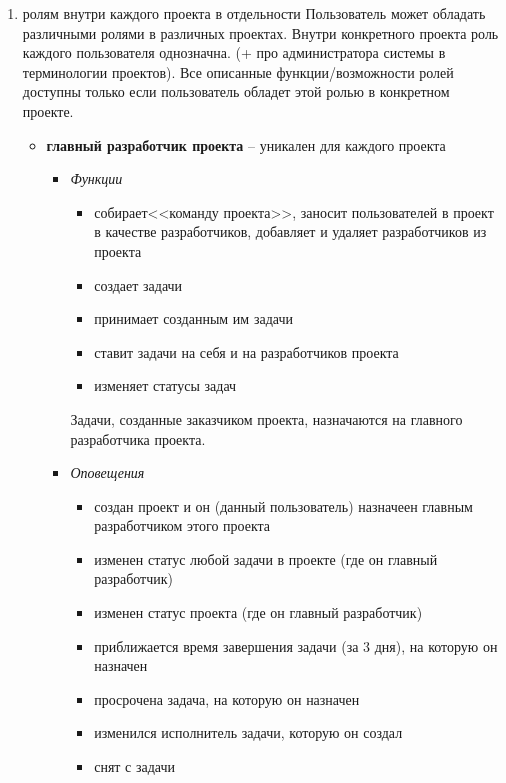 \documentclass[14pt,a4paper]{extarticle}
\begin{document}
\begin{enumerate}
\begin{enumerate}
			\item { ролям внутри каждого проекта в отдельности}
			Пользователь может обладать различными ролями в различных проектах. Внутри конкретного проекта роль каждого пользователя однозначна. (+ про администратора системы в терминологии проектов). Все описанные функции/возможности ролей доступны только если пользователь обладет этой ролью в конкретном проекте.
			\begin{itemize}
				\item {\bf главный разработчик проекта} -- уникален для каждого проекта
				\begin{itemize}
					\item {\it Функции}
					\begin{itemize}
						\item собирает<<команду проекта>>, заносит пользователей в проект в качестве разработчиков, добавляет и удаляет разработчиков из проекта
						\item создает задачи
						\item принимает созданным им задачи
						\item ставит задачи на себя и на разработчиков проекта
						\item изменяет статусы задач
					\end{itemize}
					Задачи, созданные заказчиком проекта, назначаются на главного разработчика проекта.
					
					\item {\it Оповещения}
					\begin{itemize}
						\item создан проект и он (данный пользователь) назначеен главным разработчиком этого проекта
						
						\item изменен статус любой задачи в проекте (где он главный разработчик)
						
						\item изменен статус проекта (где он главный разработчик)
						
						\item приближается время завершения задачи (за 3 дня), на которую он назначен
						
						\item просрочена задача, на которую он назначен
						
						\item изменился исполнитель задачи, которую он создал
						
						\item снят с задачи
					\end{itemize}
				\end{itemize}
				

\end{itemize}
\end{enumerate}
\end{enumerate}
\end{document}
